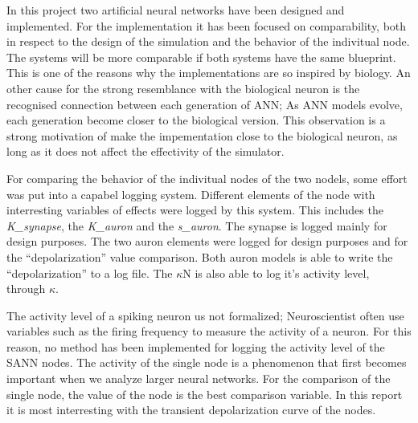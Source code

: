 




In this project two artificial neural networks have been designed and implemented. 
For the implementation it has been focused on comparability, both in respect to the design of the simulation and the behavior of the indivitual node.
The systems will be more comparable if both systems have the same blueprint. 
This is one of the reasons why the implementations are so inspired by biology.
An other cause for the strong resemblance with the biological neuron is the recognised connection between each generation of ANN; As ANN models evolve, each generation become closer to the biological version. %
This observation is a strong motivation of make the impementation close to the biological neuron, as long as it does not affect the effectivity of the simulator. %

For comparing the behavior of the indivitual nodes of the two nodels, some effort was put into a capabel logging system. 
Different elements of the node with interresting variables of effects were logged by this system. This includes the \emph{K\_synapse}, the \emph{K\_auron} and the \emph{s\_auron}.
The synapse is logged mainly for design purposes. The two auron elements were logged for design purposes and for the ``depolarization'' value comparison.
Both auron models is able to write the ``depolarization'' to a log file. The $\kappa$N is also able to log it's activity level, through $\kappa$.

The activity level of a spiking neuron us not formalized; Neuroscientist often use variables such as the firing frequency to measure the activity of a neuron.
For this reason, no method has been implemented for logging the activity level of the SANN nodes.
The activity of the single node is a phenomenon that first becomes important when we analyze larger neural networks.
For the comparison of the single node, the value of the node is the best comparison variable. 
In this report it is most interresting with the transient depolarization curve of the nodes.




